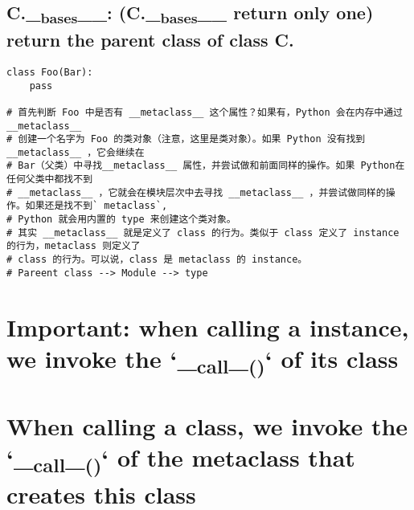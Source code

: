 \documentclass[11pt]{article}
\begin{document}
\subsection{C.\_\textsubscript{bases}\_\_: (C.\_\textsubscript{bases}\_\_ return only one) return the parent class of class C.}
\label{sec:org76b8ef8}

\begin{verbatim}
class Foo(Bar):
    pass

# 首先判断 Foo 中是否有 __metaclass__ 这个属性？如果有，Python 会在内存中通过 __metaclass__
# 创建一个名字为 Foo 的类对象（注意，这里是类对象）。如果 Python 没有找到__metaclass__ ，它会继续在
# Bar（父类）中寻找__metaclass__ 属性，并尝试做和前面同样的操作。如果 Python在任何父类中都找不到
# __metaclass__ ，它就会在模块层次中去寻找 __metaclass__ ，并尝试做同样的操作。如果还是找不到` metaclass`,
# Python 就会用内置的 type 来创建这个类对象。
# 其实 __metaclass__ 就是定义了 class 的行为。类似于 class 定义了 instance 的行为，metaclass 则定义了
# class 的行为。可以说，class 是 metaclass 的 instance。
# Pareent class --> Module --> type
\end{verbatim}
\section{Important: when calling a instance, we invoke the `\_\textsubscript{call}\_\textsubscript{()}` of its class}
\label{sec:org807a532}
\section{When calling a class, we invoke the `\_\textsubscript{call}\_\textsubscript{()}` of the metaclass that creates this class}
\label{sec:orgf728a87}
\end{document}
